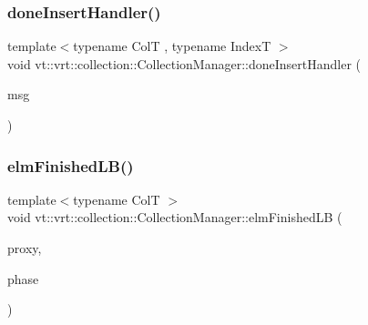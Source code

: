 \subsubsection{\texorpdfstring{done\+Insert\+Handler()}{doneInsertHandler()}}
{\footnotesize\ttfamily template$<$typename ColT , typename IndexT $>$ \\
void vt\+::vrt\+::collection\+::\+Collection\+Manager\+::done\+Insert\+Handler (\begin{DoxyParamCaption}\item[{\hyperlink{structvt_1_1vrt_1_1collection_1_1_done_insert_msg}{Done\+Insert\+Msg}$<$ ColT, IndexT $>$ $\ast$}]{msg }\end{DoxyParamCaption})\hspace{0.3cm}{\ttfamily [static]}}

\mbox{\label{structvt_1_1vrt_1_1collection_1_1_collection_manager_aa80bf07ee33e5e75de987ac82b79ae18}} 
\subsubsection{\texorpdfstring{elm\+Finished\+L\+B()}{elmFinishedLB()}}
{\footnotesize\ttfamily template$<$typename ColT $>$ \\
void vt\+::vrt\+::collection\+::\+Collection\+Manager\+::elm\+Finished\+LB (\begin{DoxyParamCaption}\item[{\hyperlink{namespacevt_1_1vrt_a620a5c8c59d13e513f690c74b4af516f}{Virtual\+Elm\+Proxy\+Type}$<$ ColT $>$ const \&}]{proxy,  }\item[{\hyperlink{namespacevt_a46ce6733d5cdbd735d561b7b4029f6d7}{Phase\+Type}}]{phase }\end{DoxyParamCaption})}

\mbox{\label{structvt_1_1vrt_1_1collection_1_1_collection_manager_a009a33f449e14d32d73aae33224298ef}} 
